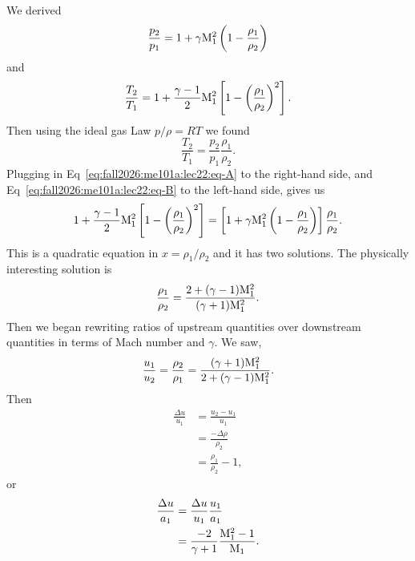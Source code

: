 \begin{node}[Review]
We derived
\begin{equation}\label{eq:fall2026:me101a:lec22:eq-A}
\frac{p_{2}}{p_{1}}=1+\gamma\mathrm{M}_{1}^{2}\left(1-\frac{\rho_{1}}{\rho_{2}}\right)
\end{equation}
and
\begin{equation}\label{eq:fall2026:me101a:lec22:eq-B}
\frac{T_{2}}{T_{1}}=1+\frac{\gamma-1}{2}\mathrm{M}_{1}^{2}\left[1-\left(\frac{\rho_{1}}{\rho_{2}}\right)^{2}\right].
\end{equation}
Then using the ideal gas Law $p/\rho = RT$ we found
\begin{equation}
\frac{T_{2}}{T_{1}}=\frac{p_{2}}{p_{1}}\frac{\rho_{1}}{\rho_{2}}.
\end{equation}
Plugging in Eq~\eqref{eq:fall2026:me101a:lec22:eq-A} to the right-hand
side, and Eq~\eqref{eq:fall2026:me101a:lec22:eq-B} to the left-hand
side, gives us
\begin{equation}
1+\frac{\gamma-1}{2}\mathrm{M}_{1}^{2}\left[1-\left(\frac{\rho_{1}}{\rho_{2}}\right)^{2}\right]=\left[1+\gamma\mathrm{M}_{1}^{2}\left(1-\frac{\rho_{1}}{\rho_{2}}\right)\right]\frac{\rho_{1}}{\rho_{2}}.
\end{equation}
This is a quadratic equation in $x=\rho_{1}/\rho_{2}$ and it has two
solutions. The physically interesting solution is
\begin{equation}\label{eq:fall2026:me101a:lec22:eq-1}
\frac{\rho_{1}}{\rho_{2}}=\frac{2+(\gamma-1)\mathrm{M}_{1}^{2}}{(\gamma+1)\mathrm{M}_{1}^{2}}.
\end{equation}
Then we began rewriting ratios of upstream quantities over downstream
quantities in terms of Mach number and $\gamma$. We saw,
\begin{equation}
\frac{u_{1}}{u_{2}}=\frac{\rho_{2}}{\rho_{1}}=\frac{(\gamma+1)\mathrm{M}_{1}^{2}}{2+(\gamma-1)\mathrm{M}_{1}^{2}}.
\end{equation}
Then
\begin{subequations}\label{eq:fall2026:me101a:lec22:delta-u-over-u}
  \begin{align}
\frac{\Delta u}{u_{1}} &= \frac{u_{2}-u_{1}}{u_{1}}\\
&=\frac{-\Delta\rho}{\rho_{2}}\\
&=\frac{\rho_{1}}{\rho_{2}}-1,
  \end{align}
\end{subequations}
or
\begin{subequations}\label{eq:fall2026:me101a:lec22:delta-u-over-a}
  \begin{align}
\frac{\Delta u}{a_{1}} &= \frac{\Delta u}{u_{1}}\frac{u_{1}}{a_{1}}\\
&=\frac{-2}{\gamma+1}\frac{\mathrm{M}_{1}^{2}-1}{\mathrm{M}_{1}}.
  \end{align}
\end{subequations}
\end{node}

